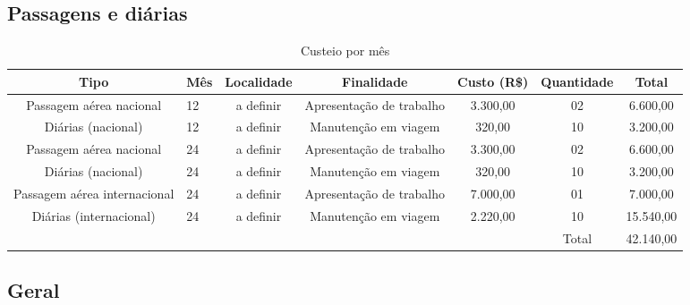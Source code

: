 \subsection{Passagens e diárias}
\begin{table}[!h]
\centering
	\caption{Custeio por mês}
\begin{tabular}{clccccc}
\toprule
	Tipo                         & Mês & Localidade & Finalidade               & Custo (R\$) & Quantidade & Total    \\
	\midrule
	Passagem aérea nacional      & 12  & a definir  & Apresentação de trabalho & 3.300,00    & 02         &  6.600,00 \\
	Diárias (nacional)           & 12  & a definir  & Manutenção em viagem     &   320,00    & 10         &  3.200,00 \\
	Passagem aérea nacional      & 24  & a definir  & Apresentação de trabalho & 3.300,00    & 02         &  6.600,00 \\
	Diárias (nacional)           & 24  & a definir  & Manutenção em viagem     &   320,00    & 10         &  3.200,00 \\
	Passagem aérea internacional & 24  & a definir  & Apresentação de trabalho & 7.000,00    & 01         &  7.000,00 \\
	Diárias (internacional)      & 24  & a definir  & Manutenção em viagem     & 2.220,00    & 10         & 15.540,00 \\
\midrule
	                             &     &            &                          &             & Total      & 42.140,00 \\
\bottomrule
\end{tabular}
	\label{tab:viagem}
\end{table}
 
\subsection{Geral}
